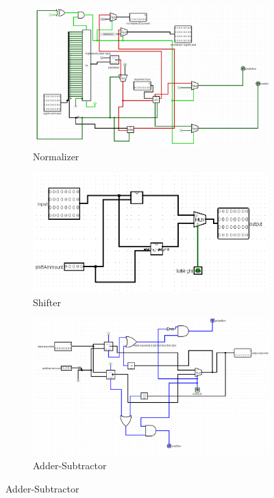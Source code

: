 \documentclass{article}
\begin{document}
\begin{figure}[h!]
    \centering
    \begin{subfigure}[b]{0.3\textwidth}
        \includegraphics[width=\textwidth]{Normalizer.png}
        \caption{Normalizer}
    \end{subfigure}
    \begin{subfigure}[b]{0.3\textwidth}
        \includegraphics[width=\textwidth]{Shifter.png}
        \caption{Shifter}
    \end{subfigure}
    \begin{subfigure}[b]{0.3\textwidth}
        \includegraphics[width=\textwidth]{adder_subtractor.png}
        \caption{Adder-Subtractor}
    \end{subfigure}
    

\end{figure}
\end{document}
